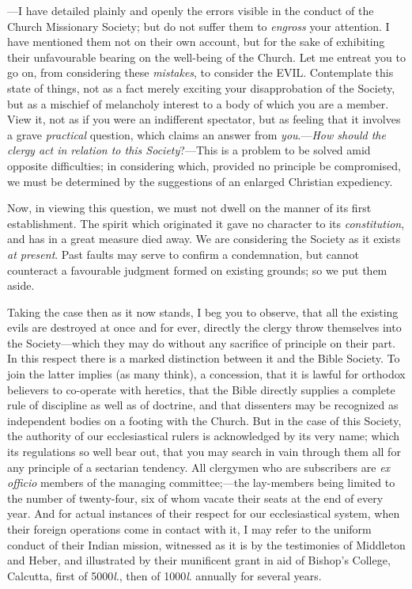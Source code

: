 —I have detailed plainly and openly the errors
visible in the conduct of the Church Missionary Society; but do not
suffer them to \emph{engross} your attention. I have mentioned them
not on their own account, but for the sake of exhibiting their
unfavourable bearing on the well-being of the Church. Let me entreat
you to go on, from considering these \emph{mistakes}, to consider the EVIL.
Contemplate this state of things, not as a fact merely exciting your
disapprobation of the Society, but as a mischief of melancholy
interest to a body of which you are a member. View it, not as if you
were an indifferent spectator, but as feeling that it involves a grave
\emph{practical} question, which claims an answer from \emph{you}.—\emph{How
should the clergy act in relation to this Society}?—This is a
problem to be solved amid opposite difficulties; in considering which,
provided no principle be compromised, we must be determined by the
suggestions of an enlarged Christian expediency.

Now, in viewing this question, we must not dwell
on the manner of its first establishment. The spirit which originated
it gave no character to its \emph{constitution}, and has in a great
measure died away. We are considering the Society as it exists \emph{at
present}. Past faults may serve to confirm a condemnation, but
cannot counteract a favourable judgment formed on existing
grounds; so we put them aside.

Taking the case then as it now stands, I beg you
to observe, that all the existing evils are destroyed at once and for
ever, directly the clergy throw themselves into the Society—which
they may do without any sacrifice of principle on their part. In this
respect there is a marked distinction between it and the Bible
Society. To join the latter implies (as many think), a concession,
that it is lawful for orthodox believers to co-operate with heretics,
that the Bible directly supplies a complete rule of discipline as well
as of doctrine, and that dissenters may be recognized as independent
bodies on a footing with the Church. But in the case of this Society,
the authority of our ecclesiastical rulers is acknowledged by its very
name; which its regulations so well bear out, that you may search in
vain through them all for any principle of a sectarian tendency. All
clergymen who are subscribers are \emph{ex officio} members of the
managing committee;—the lay-members being limited to the number of
twenty-four, six of whom vacate their seats at the end of every year.
And for actual instances of their respect for our ecclesiastical
system, when their foreign operations come in contact with it, I may
refer to the uniform conduct of their Indian mission, witnessed as it
is by the testimonies of Middleton and Heber, and illustrated by their
munificent grant in aid of Bishop's College, Calcutta, first of 5000\emph{l}.,
then of 1000\emph{l}. annually for several years.

